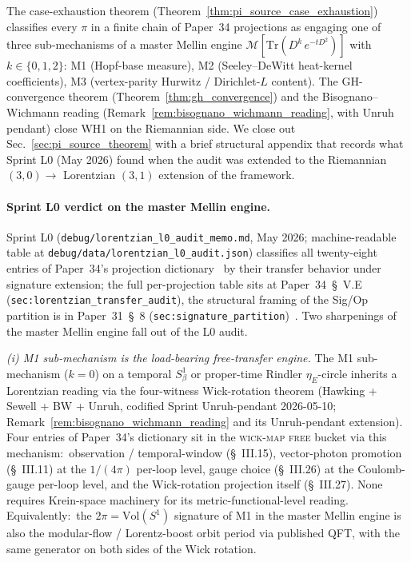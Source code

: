 \documentclass[11pt]{article}
\begin{document}
The case-exhaustion theorem
(Theorem~\ref{thm:pi_source_case_exhaustion}) classifies every $\pi$
in a finite chain of Paper~34 projections as engaging one of three
sub-mechanisms of a master Mellin engine
$\mathcal{M}[\mathrm{Tr}(D^k\,e^{-tD^2})]$ with
$k \in \{0, 1, 2\}$: M1 (Hopf-base measure), M2 (Seeley--DeWitt
heat-kernel coefficients), M3 (vertex-parity Hurwitz / Dirichlet-$L$
content).  The GH-convergence theorem
(Theorem~\ref{thm:gh_convergence}) and the Bisognano--Wichmann
reading (Remark~\ref{rem:bisognano_wichmann_reading}, with Unruh
pendant) close WH1 on the Riemannian side.  We close out
Sec.~\ref{sec:pi_source_theorem} with a brief structural appendix
that records what Sprint L0 (May 2026) found when the audit was
extended to the Riemannian $(3, 0) \to$ Lorentzian $(3, 1)$
extension of the framework.

\paragraph{Sprint L0 verdict on the master Mellin engine.}
Sprint L0 (\texttt{debug/lorentzian\_l0\_audit\_memo.md}, May 2026;
machine-readable table at
\texttt{debug/data/lorentzian\_l0\_audit.json}) classifies all
twenty-eight entries of Paper~34's projection
dictionary~\cite{paper34} by their transfer behavior under signature
extension; the full per-projection table sits at
Paper~34~\S~V.E (\texttt{sec:lorentzian\_transfer\_audit}), the
structural framing of the Sig/Op partition is in Paper~31~\S~8
(\texttt{sec:signature\_partition})~\cite{paper31}.  Two
sharpenings of the master Mellin engine fall out of the L0 audit.

\medskip
\noindent\emph{(i) M1 sub-mechanism is the load-bearing free-transfer
engine.}  The M1 sub-mechanism ($k = 0$) on a temporal $S^1_\beta$ or
proper-time Rindler $\eta_E$-circle inherits a Lorentzian reading via
the four-witness Wick-rotation theorem (Hawking + Sewell + BW + Unruh,
codified Sprint Unruh-pendant 2026-05-10;
Remark~\ref{rem:bisognano_wichmann_reading} and its Unruh-pendant
extension).  Four entries of Paper~34's dictionary sit in the
\textsc{wick-map free} bucket via this mechanism:\ observation /
temporal-window (\S~III.15), vector-photon promotion (\S~III.11) at
the $1/(4\pi)$ per-loop level, gauge choice (\S~III.26) at the
Coulomb-gauge per-loop level, and the Wick-rotation projection itself
(\S~III.27).  None requires Krein-space machinery for its
metric-functional-level reading.  Equivalently:\ the
$2\pi = \mathrm{Vol}(S^1)$ signature of M1 in the master Mellin engine
is also the modular-flow / Lorentz-boost orbit period via published
QFT, with the same generator on both sides of the Wick rotation.
\end{document}
